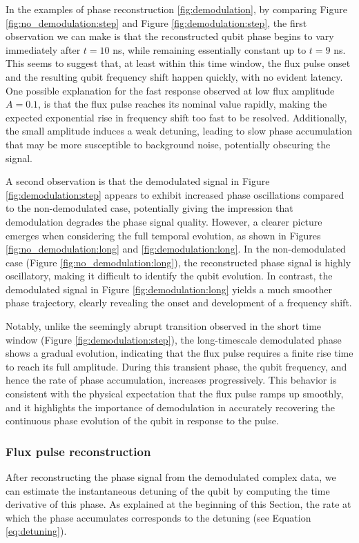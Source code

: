 In the examples of phase reconstruction \ref{fig:demodulation}, by comparing Figure \ref{fig:no_demodulation:step} and Figure \ref{fig:demodulation:step}, the first observation we can make is that the reconstructed qubit phase begins to vary immediately after $t=10$ ns, while remaining essentially constant up to $t=9$ ns. 
This seems to suggest that, at least within this time window, the flux pulse onset and the resulting qubit frequency shift happen quickly, with no evident latency.
One possible explanation for the fast response observed at low flux amplitude $A = 0.1$, is that the flux pulse reaches its nominal value rapidly, making the expected exponential rise in frequency shift too fast to be resolved. 
Additionally, the small amplitude induces a weak detuning, leading to slow phase accumulation that may be more susceptible to background noise, potentially obscuring the signal.

A second observation is that the demodulated signal in Figure \ref{fig:demodulation:step} appears to exhibit increased phase oscillations compared to the non-demodulated case, potentially giving the impression that demodulation degrades the phase signal quality. 
However, a clearer picture emerges when considering the full temporal evolution, as shown in Figures \ref{fig:no_demodulation:long} and \ref{fig:demodulation:long}. 
In the non-demodulated case (Figure \ref{fig:no_demodulation:long}), the reconstructed phase signal is highly oscillatory, making it difficult to identify the qubit evolution. 
In contrast, the demodulated signal in Figure \ref{fig:demodulation:long} yields a much smoother phase trajectory, clearly revealing the onset and development of a frequency shift.

Notably, unlike the seemingly abrupt transition observed in the short time window (Figure \ref{fig:demodulation:step}), the long-timescale demodulated phase shows a gradual evolution, indicating that the flux pulse requires a finite rise time to reach its full amplitude. 
During this transient phase, the qubit frequency, and hence the rate of phase accumulation, increases progressively. 
This behavior is consistent with the physical expectation that the flux pulse ramps up smoothly, and it highlights the importance of demodulation in accurately recovering the continuous phase evolution of the qubit in response to the pulse.

\subsubsection{Flux pulse reconstruction}\label{subsec:WL}
After reconstructing the phase signal from the demodulated complex data, we can estimate the instantaneous detuning of the qubit by computing the time derivative of this phase. 
As explained at the beginning of this Section, the rate at which the phase accumulates corresponds to the detuning (see Equation \ref{eq:detuning}). 

